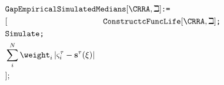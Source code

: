     \begin{equation}\begin{gathered}\begin{aligned}
      \lefteqn{    \texttt{GapEmpiricalSimulatedMedians$[\CRRA,\beth]$:=}}    \nonumber \\
                                                                           &[&\texttt{ConstructcFuncLife$[\CRRA,\beth]$;}\nonumber\\
                                                                           &\texttt{Simulate;}\nonumber\\
                                                                           &\sum\limits_{i}^{N}\weight _{i}\left|\varsigma_{i}^{\tau }-\mathbf{s}^{\tau}(\xi )\right| \nonumber\\
                                                                           &];&\nonumber
    \end{aligned}\end{gathered}\end{equation}
  
